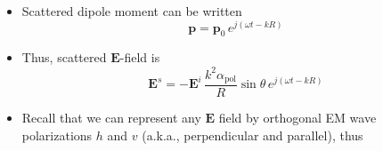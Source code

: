 \documentclass[11pt, oneside]{article}
\begin{document}
\begin{itemize}
\begin{itemize}
\begin{equation}
		\end{equation}
		where $\theta \equiv$ angle between scattered dipole moment $\mathbf{p}$ and direction of observation\\
		(Gaussian units, as in Liou; in SI the right side carries a factor $1/(4\pi\varepsilon_0)$; equivalently, replace $\alpha_\mathrm{pol}$ by $\alpha_\mathrm{pol}/(4\pi\varepsilon_0)$ in what follows)
		\item[--] Scattered dipole moment can be written
		\begin{equation}
			\label{e:p}
			\mathbf{p} = \mathbf{p}_0\,e^{j(\omega t - kR)}
		\end{equation}
		\item[--] Thus, scattered $\mathbf{E}$-field is
		\begin{equation}
			\label{e:Escat}
			\mathbf{E}^s = -\mathbf{E}^i\,\frac{k^2\alpha_\mathrm{pol}}{R}\sin\theta\,e^{j(\omega t - kR)}
		\end{equation}
		\item[--] Recall that we can represent any $\mathbf{E}$ field by orthogonal EM wave polarizations $h$ and $v$ (a.k.a., perpendicular and parallel), thus
		\begin{align}

\end{align}
\end{itemize}
\end{itemize}
\end{document}
